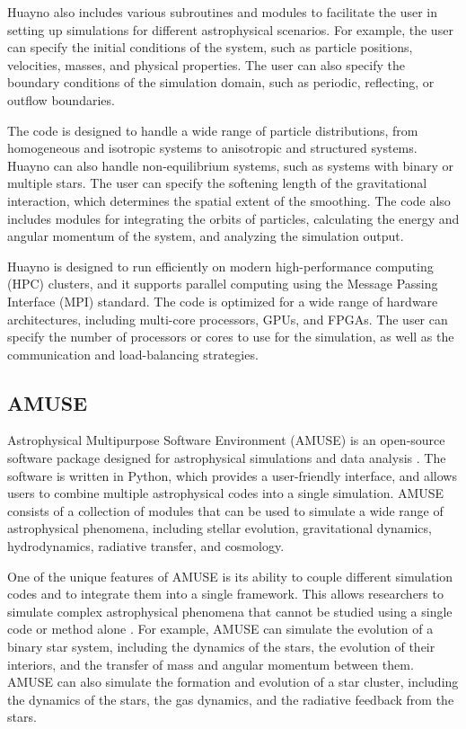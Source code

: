 Huayno also includes various subroutines and modules to facilitate the user in setting up simulations for different astrophysical scenarios. For example, the user can specify the initial conditions of the system, such as particle positions, velocities, masses, and physical properties. The user can also specify the boundary conditions of the simulation domain, such as periodic, reflecting, or outflow boundaries.

The code is designed to handle a wide range of particle distributions, from homogeneous and isotropic systems to anisotropic and structured systems. Huayno can also handle non-equilibrium systems, such as systems with binary or multiple stars. The user can specify the softening length of the gravitational interaction, which determines the spatial extent of the smoothing. The code also includes modules for integrating the orbits of particles, calculating the energy and angular momentum of the system, and analyzing the simulation output.

Huayno is designed to run efficiently on modern high-performance computing (HPC) clusters, and it supports parallel computing using the Message Passing Interface (MPI) standard. The code is optimized for a wide range of hardware architectures, including multi-core processors, GPUs, and FPGAs. The user can specify the number of processors or cores to use for the simulation, as well as the communication and load-balancing strategies.

\subsection{AMUSE}

Astrophysical Multipurpose Software Environment (AMUSE) is an open-source software package designed for astrophysical simulations and data analysis \citep{pelupessy2013astrophysical,portegies2018astrophysical}. The software is written in Python, which provides a user-friendly interface, and allows users to combine multiple astrophysical codes into a single simulation. AMUSE consists of a collection of modules that can be used to simulate a wide range of astrophysical phenomena, including stellar evolution, gravitational dynamics, hydrodynamics, radiative transfer, and cosmology.

One of the unique features of AMUSE is its ability to couple different simulation codes and to integrate them into a single framework. This allows researchers to simulate complex astrophysical phenomena that cannot be studied using a single code or method alone \citep{pelupessy2013astrophysical,portegies2018astrophysical}. For example, AMUSE can simulate the evolution of a binary star system, including the dynamics of the stars, the evolution of their interiors, and the transfer of mass and angular momentum between them. AMUSE can also simulate the formation and evolution of a star cluster, including the dynamics of the stars, the gas dynamics, and the radiative feedback from the stars.

